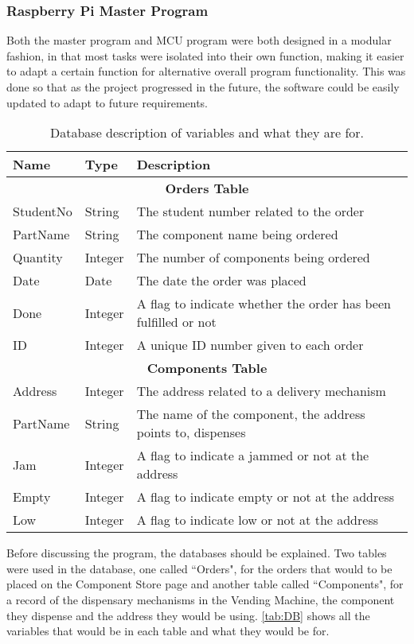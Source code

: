 \documentclass[a4paper,11pt]{article}
\numberwithin{figure}{section}
\numberwithin{table}{section}
\begin{document}
\subsubsection{Raspberry Pi Master Program}

Both the master program and MCU program were both designed in a modular fashion, in that most tasks were isolated into their own function, making it easier to adapt a certain function for alternative overall program functionality. This was done so that as the project progressed in the future, the software could be easily updated to adapt to future requirements.

	\begin{center}
		\begin{table}[ht]
			\centering
			\begin{tabular}{| m{2cm} | m{2cm}| m{10cm} |}
			\hline 
			Name & Type & Description\\
			\hline
			\multicolumn{3}{|c|}{\bfseries Orders Table}\\
			\hline	
			StudentNo & String & The student number related to the order \\
			\hline
			PartName & String & The component name being ordered \\
			\hline
			Quantity & Integer & The number of components being ordered \\
			\hline			
			Date & Date & The date the order was placed \\
			\hline
			Done & Integer & A flag to indicate whether the order has been fulfilled or not\\
			\hline
			ID & Integer & A unique ID number given to each order\\
			\hline
			\multicolumn{3}{|c|}{\bfseries Components Table}\\
			\hline
			Address & Integer & The address related to a delivery mechanism \\
			\hline
			PartName & String & The name of the component, the address points to, dispenses \\
			\hline
			Jam & Integer & A flag to indicate a jammed or not at the address\\
			\hline
			Empty & Integer & A flag to indicate empty or not at the address\\
			\hline
			Low & Integer & A flag to indicate low or not at the address\\
			\hline
			\end{tabular}
		\caption{Database description of variables and what they are for. \label{tab:DB}}
		\end{table}
	\end{center}
Before discussing the program, the databases should be explained. Two tables were used in the database, one called ``Orders", for the orders that would to be placed on the Component Store page and another table called ``Components", for a record of the dispensary mechanisms in the Vending Machine, the component they dispense and the address they would be using. \autoref{tab:DB} shows all the variables that would be in each table and what they would be for.
\end{document}
